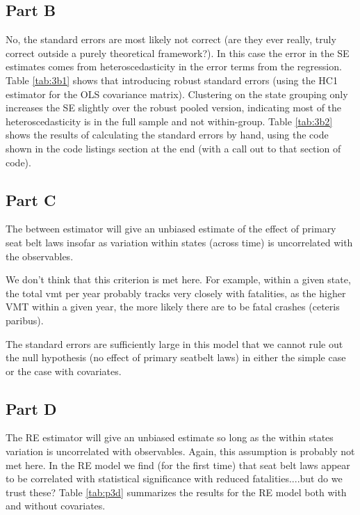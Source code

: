 \documentclass[letterpaper, 12pt]{article}
\begin{document}
\subsection{Part B}
No, the standard errors are most likely not correct (are they ever really, truly correct outside a purely theoretical framework?).  In this case the error in the SE estimates comes from heteroscedasticity in the error terms from the regression.  Table \ref{tab:3b1} shows that introducing robust standard errors (using the HC1 estimator for the OLS covariance matrix).  Clustering on the state grouping only increases the SE slightly over the robust pooled version, indicating most of the heteroscedasticity is in the full sample and not within-group.  
Table \ref{tab:3b2} shows the results of calculating the standard errors by hand, using the code shown in the code listings section at the end (with a call out to that section of code).





\subsection{Part C}
The between estimator will give an unbiased estimate of the effect of primary seat belt laws insofar as variation within states (across time) is uncorrelated with the observables.


We don't think that this criterion is met here. For example, within a given state, the total vmt per year probably tracks very closely with fatalities, as the higher VMT within a given year, the more likely there are to be fatal crashes (ceteris paribus).  

The standard errors are sufficiently large in this model that we cannot rule out the null hypothesis (no effect of primary seatbelt laws) in either the simple case or the case with covariates. 

\subsection{Part D}
The RE estimator will give an unbiased estimate so long as the within states variation is uncorrelated with observables. Again, this assumption is probably not met here.  In the RE model we find (for the first time) that seat belt laws appear to be correlated with statistical significance with reduced fatalities....but do we trust these?  Table \ref{tab:p3d} summarizes the results for the RE model both with and without covariates.  

\end{document}
